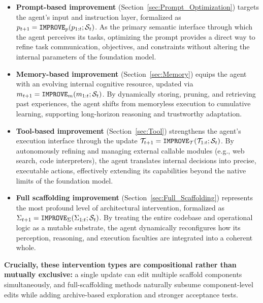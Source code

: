 \begin{itemize}[leftmargin=*]
    \item \textbf{Prompt-based improvement} (Section~\ref{sec:Prompt_Optimization}) targets the agent's input and instruction layer, formalized as $p_{t+1}=\operatorname{\mathtt{IMPROVE}}_{p}(p_{1:t};\mathcal{S}_t)$.  As the primary semantic interface through which the agent perceives its tasks, optimizing the prompt provides a direct way to refine task communication, objectives, and constraints without altering the internal parameters of the foundation model.

    
    \item \textbf{Memory-based improvement} (Section~\ref{sec:Memory}) equips the agent with an evolving internal cognitive resource, updated via $m_{t+1}=\operatorname{\mathtt{IMPROVE}}_{m}(m_{1:t};\mathcal{S}_t)$. 
    By dynamically storing, pruning, and retrieving past experiences, the agent shifts from memoryless execution to cumulative learning, supporting long-horizon reasoning and trustworthy adaptation.  

    
    \item \textbf{Tool-based improvement} (Section~\ref{sec:Tool}) strengthens the agent's execution interface through the update $\mathcal{T}_{t+1}=\operatorname{\mathtt{IMPROVE}}_{\mathcal{T}}(\mathcal{T}_{1:t};\mathcal{S}_t)$. 
    By autonomously refining and managing external callable modules (e.g., web search, code interpreters), the agent translates internal decisions into precise, executable actions, effectively extending its capabilities beyond the native limits of the foundation model.

    
    \item \textbf{Full scaffolding improvement} (Section~\ref{sec:Full_Scaffolding}) represents the most profound level of architectural intervention, formalized as $\Sigma_{t+1}=\operatorname{\mathtt{IMPROVE}}_{\Sigma}(\Sigma_{1:t};\mathcal{S}_t)$. 
    By treating the entire codebase and operational logic as a mutable substrate, the agent dynamically reconfigures how its perception, reasoning, and execution faculties are integrated into a coherent whole.
\end{itemize}

\textbf{Crucially, these intervention types are compositional rather than mutually exclusive:} a single update can edit multiple scaffold components simultaneously, and full-scaffolding methods naturally subsume component-level edits while adding archive-based exploration and stronger acceptance tests.



